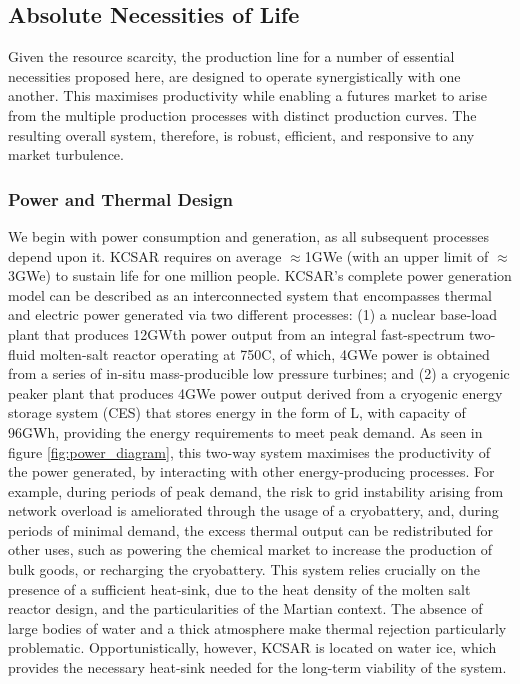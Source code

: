 \documentclass[fleqn,10pt]{Stylesheet} %
\begin{document}
\subsection{Absolute Necessities of Life}

Given the resource scarcity, the production line for a number of essential necessities proposed here, are designed to operate synergistically with one another. This maximises productivity while enabling a futures market to arise from the multiple production processes with distinct production curves. The resulting overall system, therefore, is robust, efficient, and responsive to any market turbulence.

\subsubsection{Power and Thermal Design}
\label{sec:necessities_power}

We begin with power consumption and generation, as all subsequent processes depend upon it. KCSAR requires on average $\approx$1GWe (with an upper limit of $\approx$3GWe) to sustain life for one million people. KCSAR’s complete power generation model can be described as an interconnected system that encompasses thermal and electric power generated via two different processes: (1) a nuclear base-load plant that produces 12GWth power output from an integral fast-spectrum two-fluid molten-salt reactor operating at 750\degree{}C, of which, 4GWe power is obtained from a series of in-situ mass-producible low pressure turbines; and (2) a cryogenic peaker plant that produces 4GWe power output derived from a cryogenic energy storage system (CES) that stores energy in the form of L, with capacity of 96GWh, providing the energy requirements to meet peak demand. As seen in figure \ref{fig:power_diagram}, this two-way system maximises the productivity of the power generated, by interacting with other energy-producing processes. For example, during periods of peak demand, the risk to grid instability arising from network overload is ameliorated through the usage of a cryobattery, and, during periods of minimal demand, the excess thermal output can be redistributed for other uses, such as powering the chemical market to increase the production of bulk goods, or recharging the cryobattery. This system relies crucially on the presence of a sufficient heat-sink, due to the heat density of the molten salt reactor design, and the particularities of the Martian context. The absence of large bodies of water and a thick atmosphere make thermal rejection particularly problematic. Opportunistically, however, KCSAR is located on water ice, which provides the necessary heat-sink needed for the long-term viability of the system.
\end{document}
